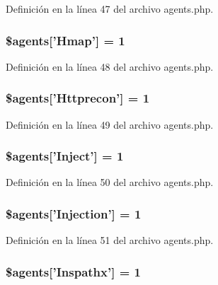 Definición en la línea 47 del archivo agents.\-php.

\hypertarget{agents_8php_a0d45a27d98966a60d038efe60ed24afb}{
\subsubsection[{\$agents}]{\setlength{\rightskip}{0pt plus 5cm}\$agents\mbox{[}'Hmap'\mbox{]} = 1}}\label{agents_8php_a0d45a27d98966a60d038efe60ed24afb}


Definición en la línea 48 del archivo agents.\-php.

\hypertarget{agents_8php_a92f7591da48b2ff1a9c3c3a6ad5a67ee}{
\subsubsection[{\$agents}]{\setlength{\rightskip}{0pt plus 5cm}\$agents\mbox{[}'Httprecon'\mbox{]} = 1}}\label{agents_8php_a92f7591da48b2ff1a9c3c3a6ad5a67ee}


Definición en la línea 49 del archivo agents.\-php.

\hypertarget{agents_8php_a92b2858a0539a49da723bf4681d42866}{
\subsubsection[{\$agents}]{\setlength{\rightskip}{0pt plus 5cm}\$agents\mbox{[}'Inject'\mbox{]} = 1}}\label{agents_8php_a92b2858a0539a49da723bf4681d42866}


Definición en la línea 50 del archivo agents.\-php.

\hypertarget{agents_8php_acf6d2835635ac58884c5968ed3a2cc6b}{
\subsubsection[{\$agents}]{\setlength{\rightskip}{0pt plus 5cm}\$agents\mbox{[}'Injection'\mbox{]} = 1}}\label{agents_8php_acf6d2835635ac58884c5968ed3a2cc6b}


Definición en la línea 51 del archivo agents.\-php.

\hypertarget{agents_8php_a8b21e7f94e4d7cb4a3297d581c8bcf6a}{
\subsubsection[{\$agents}]{\setlength{\rightskip}{0pt plus 5cm}\$agents\mbox{[}'Inspathx'\mbox{]} = 1}}\label{agents_8php_a8b21e7f94e4d7cb4a3297d581c8bcf6a}


